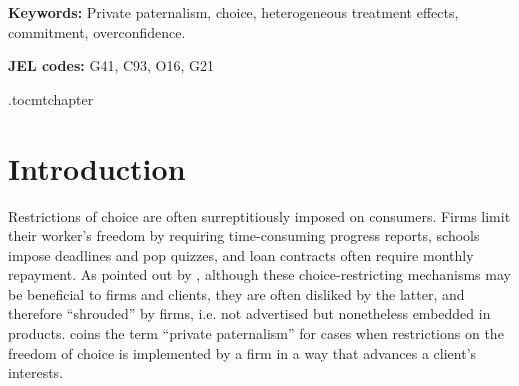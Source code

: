 \documentclass[oneside,11pt]{article}
\begin{document}
\vspace{.3in}

\textbf{Keywords: } Private paternalism, choice, heterogeneous treatment effects, commitment, overconfidence.

\textbf{JEL codes:} G41, C93, O16, G21

\newpage

\etocdepthtag.toc{mtchapter}





\section{Introduction}

Restrictions of choice are often surreptitiously imposed on consumers. Firms limit their worker's freedom by requiring time-consuming progress reports,  schools impose deadlines and pop quizzes, and loan contracts often require monthly repayment. As pointed out by \cite{Laibson2018}, although these choice-restricting mechanisms may be beneficial to firms and clients, they are often disliked by the latter, and therefore ``shrouded'' by firms, i.e. not advertised but nonetheless embedded in products. \cite{Laibson2018} coins the term ``private paternalism'' for cases when restrictions on the freedom of choice is implemented by a firm in a way that advances a client's interests. 
\end{document}
